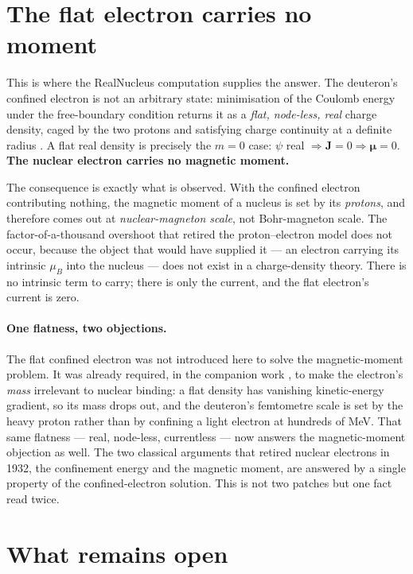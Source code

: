 \documentclass[11pt]{article}
\begin{document}
\section{The flat electron carries no moment}
\label{sec:flat}

This is where the RealNucleus computation supplies the answer. The deuteron's confined electron is not an
arbitrary state: minimisation of the Coulomb energy under the free-boundary condition returns it as a
\emph{flat, node-less, real} charge density, caged by the two protons and satisfying charge continuity at
a definite radius \cite{RealNucleus}. A flat real density is precisely the $m=0$ case: $\psi$ real
$\Rightarrow \mathbf J = 0 \Rightarrow \boldsymbol\mu = 0$. \textbf{The nuclear electron carries no
magnetic moment.}

The consequence is exactly what is observed. With the confined electron contributing nothing, the
magnetic moment of a nucleus is set by its \emph{protons}, and therefore comes out at
\emph{nuclear-magneton scale}, not Bohr-magneton scale. The factor-of-a-thousand overshoot that retired
the proton--electron model does not occur, because the object that would have supplied it --- an electron
carrying its intrinsic $\mu_B$ into the nucleus --- does not exist in a charge-density theory. There is
no intrinsic term to carry; there is only the current, and the flat electron's current is zero.

\paragraph{One flatness, two objections.} The flat confined electron was not introduced here to solve the
magnetic-moment problem. It was already required, in the companion work \cite{RealNucleus}, to make the
electron's \emph{mass} irrelevant to nuclear binding: a flat density has vanishing kinetic-energy
gradient, so its mass drops out, and the deuteron's femtometre scale is set by the heavy proton rather
than by confining a light electron at hundreds of MeV. That same flatness --- real, node-less,
currentless --- now answers the magnetic-moment objection as well. The two classical arguments that
retired nuclear electrons in 1932, the confinement energy and the magnetic moment, are answered by a
single property of the confined-electron solution. This is not two patches but one fact read twice.

\section{What remains open}
\label{sec:open}
\end{document}
